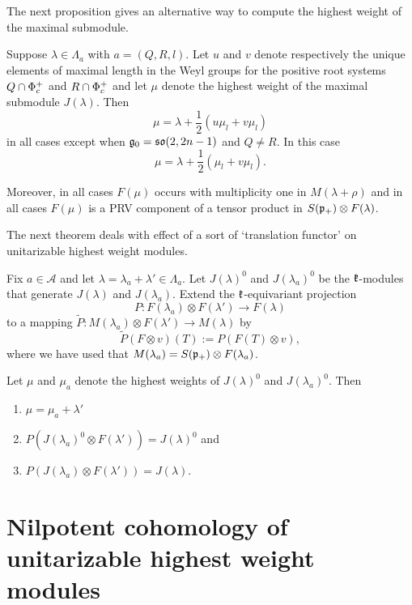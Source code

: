 The next proposition gives an alternative way to compute the highest weight of the maximal submodule.

\begin{proposition}
 Suppose $\lambda\in\Lambda_a$ with $a=(Q,R,l)$. Let $u$ and $v$ denote respectively the unique elements of maximal length in the Weyl groups for the positive root systems $Q\cap \Phi^+_c$ and $R\cap \Phi^+_c$ and let $\mu$ denote the highest weight of the maximal submodule $J(\lambda)$. Then
 \[
  \mu = \lambda + \frac{1}{2}(u \mu_l + v \mu_l)
 \]
 in all cases except when $\mathfrak{g}_0=\mathfrak{so}(2,2n-1)$ and $Q\neq R$. In this case
 \[
  \mu = \lambda + \frac{1}{2}(\mu_l + v\mu_l).
 \]

 Moreover, in all cases $F(\mu)$ occurs with multiplicity one in $M(\lambda+\rho)$ and in all cases $F(\mu)$ is a PRV component of a tensor product in $S(\mathfrak{p}_+)\otimes F(\lambda)$.
\end{proposition}

The next theorem  deals with effect of a sort of `translation functor' on unitarizable highest weight modules.
\begin{theorem}
 Fix $a\in\mathcal{A}$ and let $\lambda = \lambda_a + \lambda'\in\Lambda_a$. Let $J(\lambda)^0$ and $J(\lambda_a)^0$ be the $\mathfrak{k}$-modules that generate $J(\lambda)$ and $J(\lambda_a)$. Extend the $\mathfrak{k}$-equivariant projection \[P:F(\lambda_a)\otimes F(\lambda') \to F(\lambda)\] to a mapping $\widetilde{P}:M(\lambda_a) \otimes F(\lambda') \to M(\lambda)$ by \[\widetilde{P}(F\otimes v) (T) := P(F(T)\otimes v),\]
  where we have used that $M(\lambda_a) = S(\mathfrak{p}_+)\otimes F(\lambda_a)$.

Let $\mu$ and $\mu_a$ denote the highest weights of  $J(\lambda)^0$ and $J(\lambda_a)^0$. Then
 \begin{enumerate}
  \item $\mu  = \mu_a+\lambda'$
  \item $P(J(\lambda_a)^0\otimes F(\lambda')) = J(\lambda)^0$ and 
  \item $P(J(\lambda_a)\otimes F(\lambda')) = J(\lambda)$.
 \end{enumerate}
\end{theorem}

\section{Nilpotent cohomology of unitarizable highest weight modules}

